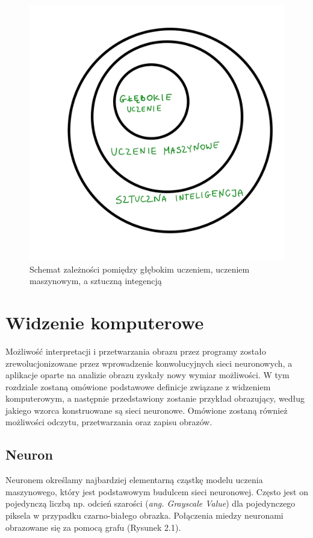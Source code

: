 \documentclass[openright]{xmgr}
\begin{document}
\begin{figure}[!tbh]
\centering
\includegraphics[width=.8\hsize]{fig/1}
\caption{Schemat zależności pomiędzy głębokim uczeniem, uczeniem maszynowym, a sztuczną integencją\label{RYS.1}}
\end{figure}

\chapter{Widzenie komputerowe  }

\indent \indent Możliwość interpretacji i przetwarzania obrazu przez programy zostało zrewolucjonizowane przez wprowadzenie konwolucyjnych sieci neuronowych, a aplikacje oparte na analizie obrazu zyskały nowy wymiar możliwości. W tym rozdziale zostaną omówione podstawowe definicje związane z widzeniem komputerowym, a następnie przedstawiony zostanie przykład obrazujący, według jakiego wzorca konstruowane są sieci neuronowe. Omówione zostaną również 
możliwości odczytu, przetwarzania oraz zapisu obrazów.

\section{Neuron  \label{s:dsssl}}

\indent \indent Neuronem określamy najbardziej elementarną cząstkę modelu uczenia maszynowego, który jest podstawowym budulcem sieci neuronowej. Często jest on pojedynczą liczbą np. odcień szarości (\textit{ang. Grayscale Value}) dla pojedynczego piksela w przypadku czarno-białego obrazka. Połączenia miedzy neuronami obrazowane się za pomocą grafu (Rysunek 2.1).
\end{document}
